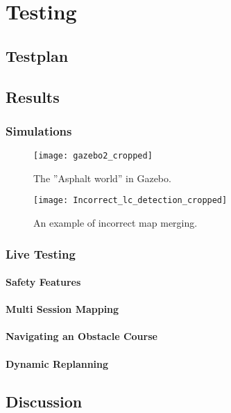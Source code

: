 \chapter{Testing}
\label{chp:testing} 

\section{Testplan}

\section{Results}

\subsection{Simulations}


\begin{figure}[p]
	\centering
	\texttt{[image: gazebo2\_cropped]}
	\caption{The ''Asphalt world'' in Gazebo. }
	\label{fig:Incorrect_lc_detection}
\end{figure}

\begin{figure}[p]
	\centering
	\texttt{[image: Incorrect\_lc\_detection\_cropped]}
	\caption{An example of incorrect map merging. }
	\label{fig:Incorrect_lc_detection}
\end{figure}

\subsection{Live Testing}

\subsubsection{Safety Features}

\subsubsection{Multi Session Mapping}

\subsubsection{Navigating an Obstacle Course}

\subsubsection{Dynamic Replanning}




\section{Discussion}